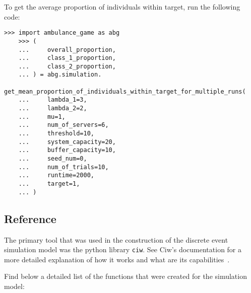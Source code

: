 To get the average proportion of individuals within target, run the following
code:

\begin{lstlisting}[style=pystyle]
    >>> import ambulance_game as abg
    >>> (
    ...     overall_proportion,
    ...     class_1_proportion,
    ...     class_2_proportion,
    ... ) = abg.simulation.
    get_mean_proportion_of_individuals_within_target_for_multiple_runs(    
    ...     lambda_1=3,
    ...     lambda_2=2,
    ...     mu=1,
    ...     num_of_servers=6,
    ...     threshold=10,
    ...     system_capacity=20,
    ...     buffer_capacity=10,
    ...     seed_num=0,
    ...     num_of_trials=10,
    ...     runtime=2000,
    ...     target=1,
    ... )
\end{lstlisting}

\subsection{Reference}
The primary tool that was used in the construction of the discrete event 
simulation model was the python library \texttt{ciw}.
See Ciw's documentation for a more detailed explanation of how it works and 
what are its capabilities~\cite{ciwpython}.

Find below a detailed list of the functions that were created for the simulation
model:

